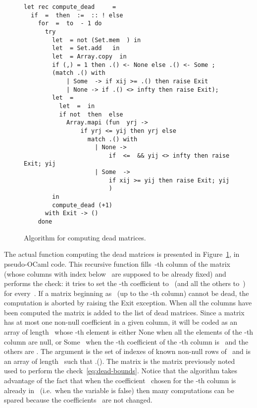 \documentclass[orivec]{llncs} \usepackage[T1]{fontenc}
\newcommand{\ie}{i.e.~}
\begin{document}
\begin{figure}[t]
{  \centering
{\small
\begin{lstlisting}
let rec compute_dead     =
  if  =  then  :=  :: ! else
    for  =  to  - 1 do
      try
        let  = not (Set.mem  ) in
        let  = Set.add   in
        let  = Array.copy  in
        if (,) = 1 then .() <- None else .() <- Some ;
        (match .() with
            | Some  -> if xij >= .() then raise Exit
            | None -> if .() <> infty then raise Exit);
        let  =
          let  =  in
          if not  then  else
            Array.mapi (fun  yrj ->
                if yrj <= yij then yrj else
                  match .() with
                    | None ->
                        if  <=  && yij <> infty then raise Exit; yij
                    | Some  ->
                        if xij >= yij then raise Exit; yij
                        ) 
        in
        compute_dead (+1)   
      with Exit -> ()
    done
\end{lstlisting}
}
}
 \vspace{-3ex}
 \caption{Algorithm for computing dead matrices.}
 \label{fig:dead-algo}
 \vspace{-4ex}
\end{figure}

The actual function computing the dead matrices is presented in
Figure~\ref{fig:dead-algo}, in pseudo-OCaml code. This recursive function
fills~-th column of the matrix~ (whose columns with index below~ are
supposed to be already fixed) and performs the check: it tries to set the -th
coefficient to~ (and all the others to~) for every~. If a
matrix beginning as~ (up to the -th column) cannot be dead, the
computation is aborted by raising the Exit exception. When all the columns have
been computed the matrix is added to the list  of dead matrices. Since a
matrix~ has at most one non-null coefficient in a given
column, it will be coded as an array of length~ whose -th element is
either None when all the elements of the -th column are null, or Some~
when the -th coefficient of the -th column is~ and the others are
. The argument  is the set of indexes of known non-null rows of~ and
 is an array of length~ such that .(). The
matrix  is the matrix previously noted~ used to perform the
check~\eqref{eq:dead-bounds}.
Notice that the algorithm takes advantage of the
fact that when the coefficient~ chosen for the -th column is already
in~ (\ie when the variable  is false) then many
computations can be spared because the coefficients~ are not
changed.
\end{document}
